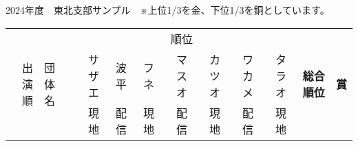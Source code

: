 \documentclass[11pt,a4paper,landscape,twoside,openany,english,uplatex]{jsarticle}
\begin{document}
2024年度　東北支部サンプル　※上位1/3を金、下位1/3を銅としています。
\begin{table}[h]
 \centering
 \begin{tabular}{r|l|rrrrrrr|r|c}
  \hline
  \multirow{3}{*}{出演順} & \multirow{3}{*}{団体名} & \multicolumn{7}{|c|}{順位} & \multirow{3}{*}{\textbf{総合順位}} &  \multirow{3}{*}{\textbf{賞}} \\
  \cline{3-9} %
    &  & サザエ & 波平 & フネ & マスオ &  カツオ & ワカメ & タラオ &  &  \\
    &  & 現地   & 配信 & 現地 & 配信   &  現地   & 配信   & 現地   &  &  \\
  \hline \hline

\end{tabular}
\end{table}
\end{document}
